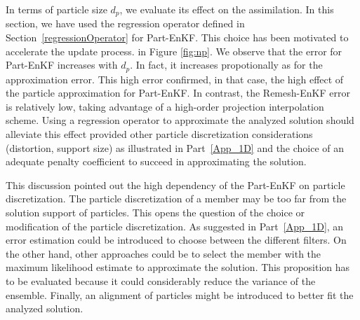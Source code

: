 In terms of particle size $d_p$, we evaluate its effect on the assimilation. In this section, we have used the regression operator defined in Section~\ref{regressionOperator} for Part-EnKF. This choice has been motivated to accelerate the update process.
in Figure \ref{fig:np}. We observe that the error for Part-EnKF increases with $d_p$. In fact, it increases propotionally as for the approximation error. This high error confirmed, in that case, the high effect of the particle approximation for Part-EnKF. In contrast, the Remesh-EnKF error is relatively low, taking advantage of a high-order projection interpolation scheme. Using a regression operator to approximate the analyzed solution should alleviate this effect provided other particle discretization considerations (distortion, support size) as illustrated in Part~\ref{App_1D} and the choice of an adequate penalty coefficient to succeed in approximating the solution.

This discussion pointed out the high dependency of the Part-EnKF on particle discretization. The particle discretization of a member may be too far from the solution support of particles. This opens the question of the choice or modification of the particle discretization. As suggested in Part~\ref{App_1D}, an error estimation could be introduced to choose between the different filters. On the other hand, other approaches could be to select the member with the maximum likelihood estimate to approximate the solution. This proposition has to be evaluated because it could considerably reduce the variance of the ensemble. Finally, an alignment of particles might be introduced to better fit the analyzed solution.

\newpage

